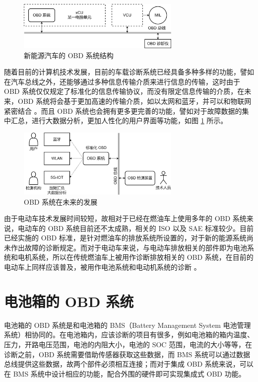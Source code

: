 \begin{figure}
	\centering
	\includegraphics[width=0.7\textwidth]{figures/OBD_structure.png}
	\caption{新能源汽车的 OBD 系统结构}\label{fig:OBD_structure}
\end{figure}

随着目前的计算机技术发展，目前的车载诊断系统已经具备多种多样的功能，譬如在汽车总线之外，还能够通过多种信息传输介质来进行信息的传输，这时由于 OBD 系统仅仅规定了标准化的信息传输协议，而没有限定信息传输的介质，在未来，OBD 系统将会基于更加高速的传输介质，如以太网和蓝牙，并可以和物联网紧密结合 \cite{屠雨2016基于汽车OBD车联网的设计与实现,白东2017基于OBD的车辆信息管理平台}。而且 OBD 系统也会拥有更多更完善的功能，譬如对于故障数据的集中汇总，进行大数据分析，更加人性化的用户界面等功能，如图 \ref{fig:OBD_structure} 所示。

\begin{figure}
	\centering
	\includegraphics[width=0.7\textwidth]{figures/OBD_future.png}
	\caption{OBD 系统在未来的发展}\label{fig:OBD_future}
\end{figure}

由于电动车技术发展时间较短，故相对于已经在燃油车上使用多年的 OBD 系统来说，电动车的 OBD 系统目前还不太成熟，相关的 ISO 以及 SAE 标准较少。目前已经实施的 OBD 标准，是针对燃油车的排放系统所设置的，对于新的能源系统尚未作出故障的诊断规定。而对于电动车来说，与电动车排放相关的部件即为电池系统和电机系统，所以在传统燃油车上被用作诊断排放相关的 OBD 系统，在目前的电动车上同样应该普及，被用作电池系统和电动机系统的诊断 \cite{Yang2013Research}。

\section{电池箱的 OBD 系统}

电池箱的 OBD 系统是和电池箱的 BMS（Battery Management System 电池管理系统）相协同的。在电池箱内，应该诊断的项目有很多，例如电池箱的箱内温度、压力，开路电压范围，电池的内阻大小，电池的 SOC 范围，电流的大小等等，在诊断之前，OBD 系统需要借助传感器获取这些数据，而 BMS 系统可以通过数据总线提供这些数据，故两个部件必须相互连接；而对于集成 OBD 系统来说，可以在 BMS 系统中设计相应的功能，配合外围的硬件即可实现集成式 OBD 功能。

